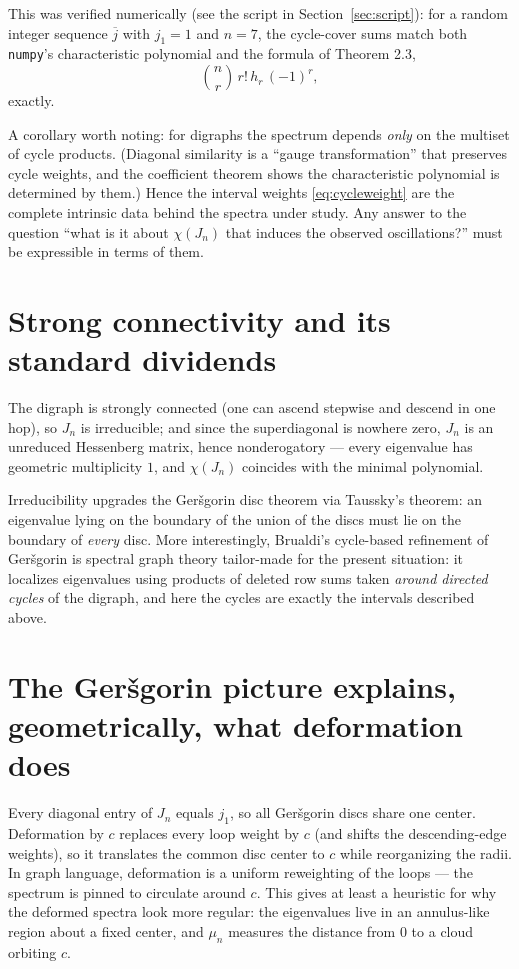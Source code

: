 \documentclass[11pt, fleqn]{amsart}
\theoremstyle{remark}
\begin{document}
This was verified numerically (see the script in
Section~\ref{sec:script}): for a random integer sequence $\overline{j}$
with $j_1=1$ and $n=7$, the cycle-cover sums match both \texttt{numpy}'s
characteristic polynomial and the formula of Theorem 2.3,
\[
\binom{n}{r}\, r!\, h_r\, (-1)^r,
\]
exactly.

A corollary worth noting: for digraphs the spectrum depends \emph{only}
on the multiset of cycle products. (Diagonal similarity is a ``gauge
transformation'' that preserves cycle weights, and the coefficient
theorem shows the characteristic polynomial is determined by them.)
Hence the interval weights \eqref{eq:cycleweight} are the complete
intrinsic data behind the spectra under study. Any answer to the
question ``what is it about $\chi(J_n)$ that induces the observed
oscillations?'' must be expressible in terms of them.

\section{Strong connectivity and its standard dividends}

The digraph is strongly connected (one can ascend stepwise and descend
in one hop), so $J_n$ is irreducible; and since the superdiagonal is
nowhere zero, $J_n$ is an unreduced Hessenberg matrix, hence
nonderogatory --- every eigenvalue has geometric multiplicity $1$, and
$\chi(J_n)$ coincides with the minimal polynomial.

Irreducibility upgrades the Ger\v{s}gorin disc theorem via Taussky's
theorem: an eigenvalue lying on the boundary of the union of the discs
must lie on the boundary of \emph{every} disc. More interestingly,
Brualdi's cycle-based refinement of Ger\v{s}gorin is spectral graph
theory tailor-made for the present situation: it localizes eigenvalues
using products of deleted row sums taken \emph{around directed cycles}
of the digraph, and here the cycles are exactly the intervals described
above.

\section{The Ger\v{s}gorin picture explains, geometrically, what
deformation does}

Every diagonal entry of $J_n$ equals $j_1$, so all Ger\v{s}gorin discs
share one center. Deformation by $c$ replaces every loop weight by $c$
(and shifts the descending-edge weights), so it translates the common
disc center to $c$ while reorganizing the radii. In graph language,
deformation is a uniform reweighting of the loops --- the spectrum is
pinned to circulate around $c$. This gives at least a heuristic for why
the deformed spectra look more regular: the eigenvalues live in an
annulus-like region about a fixed center, and $\mu_n$ measures the
distance from $0$ to a cloud orbiting $c$.
\end{document}

